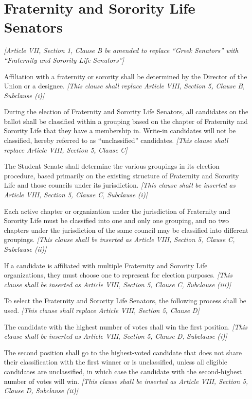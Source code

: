 \documentclass{uniondoc}
\begin{document}
\amendment{}

\section{Fraternity and Sorority Life Senators}
\textit{[Article VII, Section 1, Clause B be amended to replace ``Greek Senators'' with ``Fraternity and Sorority Life Senators'']}

Affiliation with a fraternity or sorority shall be determined by the Director of the Union or a designee.
\textit{[This clause shall replace Article VIII, Section 5, Clause B, Subclause (i)]}

During the election of Fraternity and Sorority Life Senators, all candidates on the ballot shall be classified within a grouping based on the chapter of Fraternity and Sorority Life that they have a membership in. Write-in candidates will not be classified, hereby referred to as ``unclassified'' candidates.
\textit{[This clause shall replace Article VIII, Section 5, Clause C]}

The Student Senate shall determine the various groupings in its election procedure, based primarily on the existing structure of Fraternity and Sorority Life and those councils under its jurisdiction.
\textit{[This clause shall be inserted as Article VIII, Section 5, Clause C, Subclause (i)]}

Each active chapter or organization under the jurisdiction of Fraternity and Sorority Life must be classified into one and only one grouping, and no two chapters under the jurisdiction of the same council may be classified into different groupings.
\textit{[This clause shall be inserted as Article VIII, Section 5, Clause C, Subclause (ii)]}

If a candidate is affiliated with multiple Fraternity and Sorority Life organizations, they must choose one to represent for election purposes.
\textit{[This clause shall be inserted as Article VIII, Section 5, Clause C, Subclause (iii)]}

To select the Fraternity and Sorority Life Senators, the following process shall be used.
\textit{[This clause shall replace Article VIII, Section 5, Clause D]}

The candidate with the highest number of votes shall win the first position.
\textit{[This clause shall be inserted as Article VIII, Section 5, Clause D, Subclause (i)]}

The second position shall go to the highest-voted candidate that does not share their classification with the first winner or is unclassified, unless all eligible candidates are unclassified, in which case the candidate with the second-highest number of votes will win.
\textit{[This clause shall be inserted as Article VIII, Section 5, Clause D, Subclause (ii)]}
\end{document}
